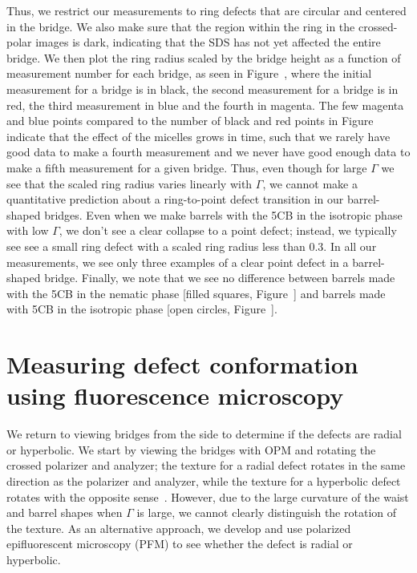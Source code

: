 Thus, we restrict our measurements to ring defects that are circular and centered in the bridge.
We also make sure that the region within the ring in the crossed-polar images is dark, indicating that the SDS has not yet affected the entire bridge.
We then plot the ring radius scaled by the bridge height as a function of measurement number for each bridge, as seen in Figure~, where the initial measurement for a bridge is in black, the second measurement for a bridge is in red, the third measurement in blue and the fourth in magenta.
The few magenta and blue points compared to the number of black and red points in Figure~ indicate that the effect of the micelles grows in time, such that we rarely have good data to make a fourth measurement and we never have good enough data to make a fifth measurement for a given bridge.
Thus, even though for large $\Gamma$ we see that the scaled ring radius varies linearly with $\Gamma$, we cannot make a quantitative prediction about a ring-to-point defect transition in our barrel-shaped bridges.
Even when we make barrels with the 5CB in the isotropic phase with low $\Gamma$, we don't see a clear collapse to a point defect; instead, we typically see see a small ring defect with a scaled ring radius less than $0.3$.
In all our measurements, we see only three examples of a clear point defect in a barrel-shaped bridge.
Finally, we note that we see no difference between barrels made with the 5CB in the nematic phase [filled squares, Figure~] and barrels made with 5CB in the isotropic phase [open circles, Figure~].





\section{Measuring defect conformation using fluorescence microscopy}
We return to viewing bridges from the side to determine if the defects are radial or hyperbolic.
We start by viewing the bridges with OPM and rotating the crossed polarizer and analyzer; the texture for a radial defect rotates in the same direction as the polarizer and analyzer, while the texture for a hyperbolic defect rotates with the opposite sense~\cite{RN177}.
However, due to the large curvature of the waist and barrel shapes when $\Gamma$ is large, we cannot clearly distinguish the rotation of the texture.
As an alternative approach, we develop and use polarized epifluorescent microscopy (PFM) to see whether the defect is radial or hyperbolic.


